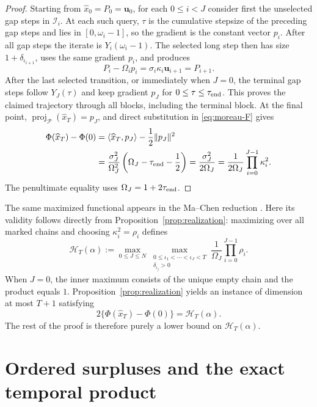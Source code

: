 \documentclass[11pt]{article}
\theoremstyle{definition}
\theoremstyle{remark}
\newcommand{\cert}{\mathcal{H}}
\begin{document}
\begin{proof}
Starting from \(\widehat x_0=P_0=\mathbf u_0\), for each \(0\le i<J\)
consider first the unselected gap steps in \(\mathcal I_i\).  At each such
query, \(\tau\) is the cumulative stepsize of the preceding gap steps and
lies in \([0,\omega_i-1]\), so the gradient is the constant vector \(p_i\).
After all gap steps the iterate is \(Y_i(\omega_i-1)\).  The selected long
step then has size \(1+\delta_{\iota_{i+1}}\), uses the same gradient \(p_i\),
and produces
\[
 P_i-\Omega_i p_i
 =\sigma_i\kappa_i\mathbf u_{i+1}
 =P_{i+1}.
\]
After the last selected transition, or immediately when \(J=0\), the
terminal gap steps follow \(Y_J(\tau)\) and keep gradient \(p_J\) for
\(0\le\tau\le\tau_{\rm end}\).  This proves the claimed trajectory through
all blocks, including the terminal block.  At the final point,
\(\operatorname{proj}_{\mathcal P}(\widehat x_T)=p_J\), and direct substitution in
\eqref{eq:moreau-F} gives
\[
\begin{aligned}
 \Phi(\widehat x_T)-\Phi(0)
 &=\langle\widehat x_T,p_J\rangle-\frac12\|p_J\|^2\\
 &=\frac{\sigma_J^2}{\Omega_J^2}
   \left(\Omega_J-\tau_{\rm end}-\frac12\right)
 =\frac{\sigma_J^2}{2\Omega_J}
 =\frac{1}{2\Omega_J}\prod_{i=0}^{J-1}\kappa_i^2.
\end{aligned}
\]
The penultimate equality uses \(\Omega_J=1+2\tau_{\rm end}\).
\end{proof}

The same maximized functional appears in the Ma--Chen reduction
\cite[Equation~(20) and Corollary~4.3]{machen2026}.  Here its validity follows
directly from Proposition~\ref{prop:realization}: maximizing over all marked
chains and choosing
\(\kappa_i^2=\rho_i\) defines
\begin{equation}
 \cert_T(\alpha)
 :=
 \max_{0\le J\le N}
 \max_{\substack{0\le \iota_1<\cdots<\iota_J<T\\
                  \delta_{\iota_j}>0}}
 \frac{1}{\Omega_J}\prod_{i=0}^{J-1}\rho_i.
 \label{eq:C-functional}
\end{equation}
When \(J=0\), the inner maximum consists of the unique empty chain and
the product equals \(1\).
Proposition~\ref{prop:realization} yields an instance of dimension at most
\(T+1\) satisfying
\begin{equation}
  2\{\Phi(\widehat x_T)-\Phi(0)\}=\cert_T(\alpha).
  \label{eq:C-attained}
\end{equation}
The rest of the proof is therefore purely a lower bound on
\(\cert_T(\alpha)\).

\section{Ordered surpluses and the exact temporal product}
\label{sec:exact-product}
\end{document}
